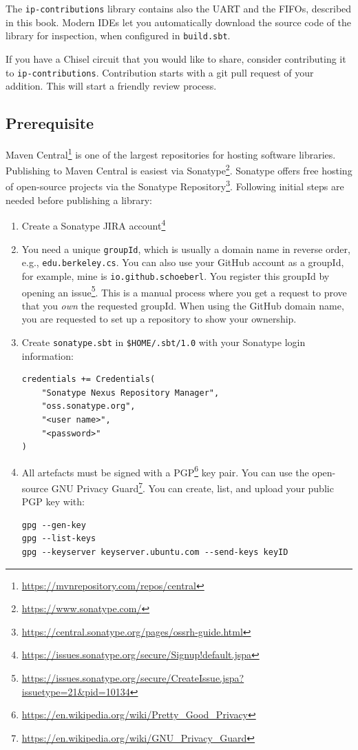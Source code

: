 \documentclass[%
    10pt,
    headinclude, footexclude,
    openright, %
    notitlepage,
    cleardoubleempty,
    headsepline,
    pointlessnumbers,
    bibtotoc, idxtotoc,
    ]{scrbook}
\newcommand{\code}[1]{{\small{\texttt{#1}}}}
\newcommand{\myref}[2]{\href{#1}{#2}}
\renewcommand{\myref}[2]{{#2}{\footnote{\url{#1}}}}
\begin{document}
\noindent The \code{ip-contributions} library contains also the UART and the FIFOs, described in this book.
Modern IDEs let you automatically download the source code of the library for inspection, when configured
in \code{build.sbt}.

If you have a Chisel circuit that you would like to share, consider contributing it to \code{ip-contributions}.
Contribution starts with a git pull request of your addition. This will start a friendly review process.

\subsection{Prerequisite}

\myref{https://mvnrepository.com/repos/central}{Maven Central} is one of the largest repositories for
hosting software libraries. Publishing to Maven Central is easiest via
\myref{https://www.sonatype.com/}{Sonatype}. Sonatype offers free hosting of open-source
projects via the \myref{https://central.sonatype.org/pages/ossrh-guide.html}{Sonatype Repository}.
Following initial steps are needed before publishing a library:

\begin{enumerate}
\item Create a \myref{https://issues.sonatype.org/secure/Signup!default.jspa}{Sonatype JIRA account}
\item You need a unique \code{groupId}, which is usually a domain name in reverse order, e.g., \code{edu.berkeley.cs}.
You can also use your GitHub account as a groupId, for example, mine is \code{io.github.schoeberl}. You register this groupId
by opening an \myref{https://issues.sonatype.org/secure/CreateIssue.jspa?issuetype=21&pid=10134}{issue}.
This is a manual process where you get a request to prove that you \emph{own} the requested groupId.
When using the GitHub domain name, you are requested to set up a repository to show your ownership.
\item Create \code{sonatype.sbt} in \code{\$HOME/.sbt/1.0} with your Sonatype login information:
\begin{verbatim}
credentials += Credentials(
    "Sonatype Nexus Repository Manager",
    "oss.sonatype.org",
    "<user name>",
    "<password>"
)
\end{verbatim}
\item All artefacts must be signed with a \myref{https://en.wikipedia.org/wiki/Pretty_Good_Privacy}{PGP} key pair.
You can use the open-source \myref{https://en.wikipedia.org/wiki/GNU_Privacy_Guard}{GNU Privacy Guard}.
You can create, list, and upload your public PGP key with:
\begin{verbatim}
gpg --gen-key
gpg --list-keys
gpg --keyserver keyserver.ubuntu.com --send-keys keyID
\end{verbatim}
\end{enumerate}
\end{document}
